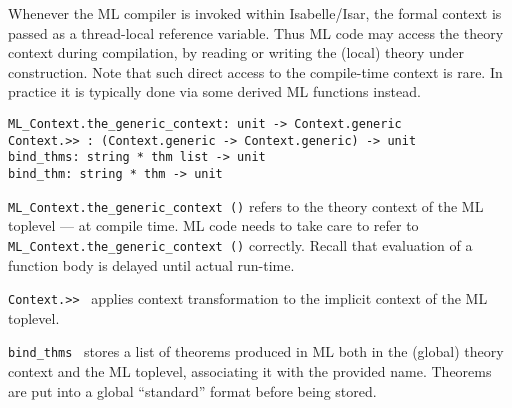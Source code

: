 \begin{isabellebody}
\endisatagML
{\isafoldML}%
%
\isadelimML
\isanewline
%
\endisadelimML
%
\isadelimproof
%
\endisadelimproof
%
\isatagproof
{}\isamarkupfalse%
%
\endisatagproof
{\isafoldproof}%
%
\isadelimproof
%
\endisadelimproof
%
\isamarkuptrue%
%
\begin{isamarkuptext}%
Whenever the ML compiler is invoked within Isabelle/Isar, the
  formal context is passed as a thread-local reference variable.  Thus
  ML code may access the theory context during compilation, by reading
  or writing the (local) theory under construction.  Note that such
  direct access to the compile-time context is rare.  In practice it
  is typically done via some derived ML functions instead.%
\end{isamarkuptext}%
\isamarkuptrue%
%
\isadelimmlref
%
\endisadelimmlref
%
\isatagmlref
%
\begin{isamarkuptext}%
\begin{mldecls}
  \verb|ML_Context.the_generic_context: unit -> Context.generic| \\
  \verb|Context.>> : (Context.generic -> Context.generic) -> unit| \\
  \verb|bind_thms: string * thm list -> unit| \\
  \verb|bind_thm: string * thm -> unit| \\
  \end{mldecls}

  \begin{description}

  \item \verb|ML_Context.the_generic_context ()| refers to the theory
  context of the ML toplevel --- at compile time.  ML code needs to
  take care to refer to \verb|ML_Context.the_generic_context ()|
  correctly.  Recall that evaluation of a function body is delayed
  until actual run-time.

  \item \verb|Context.>>|~ applies context transformation
   to the implicit context of the ML toplevel.

  \item \verb|bind_thms|~ stores a list of
  theorems produced in ML both in the (global) theory context and the
  ML toplevel, associating it with the provided name.  Theorems are
  put into a global ``standard'' format before being stored.


\end{description}
\end{isamarkuptext}
\end{isabellebody}
